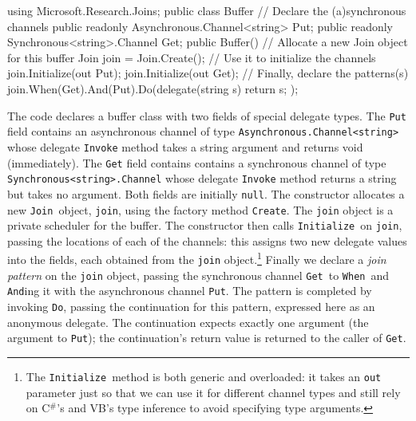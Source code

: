 \documentclass{article}
\newcommand{\csharp}{\texorpdfstring{\mbox{C$^\#$}}{C\#}}
\newcommand{\vb}{\mbox{VB}}
\newcommand{\cjoin}{{\texttt{Join}}}
\newcommand{\minitialize}{{\texttt{Initialize}}}
\newcommand{\mcreate}{{\texttt{Create}}}
\newcommand{\mwhen}{{\texttt{When}}}
\newcommand{\mand}{{\texttt{And}}}
\newcommand{\mdo}{{\texttt{Do}}}
\begin{document}
\begin{lstcsharp}
using Microsoft.Research.Joins;
public class Buffer {
  // Declare the (a)synchronous channels
  public readonly Asynchronous.Channel<string> Put;
  public readonly Synchronous<string>.Channel Get;
  public Buffer() {
    // Allocate a new Join object for this buffer
    Join join = Join.Create();
    // Use it to initialize the channels
    join.Initialize(out Put);  
    join.Initialize(out Get);
    // Finally, declare the patterns(s)
    join.When(Get).And(Put).Do(delegate(string s) {
       return s; 
    });
  }
}
\end{lstcsharp}

The code declares a buffer class with two fields of special delegate
types. The \verb+Put+ field contains an asynchronous channel of type \verb+Asynchronous.Channel<string>+ whose
delegate \verb+Invoke+ method takes a string argument and returns void (immediately).
The \verb+Get+ field contains contains a synchronous channel of type \verb+Synchronous<string>.Channel+ whose
delegate \verb+Invoke+ method returns a string but takes no argument.  Both
fields are initially \verb+null+.  The constructor allocates a new \cjoin\
object, \verb+join+, using the factory method \mcreate. The \verb+join+ object is a private scheduler
for the buffer.  The constructor then calls \minitialize\ on \verb+join+, passing the
locations of each of the channels: this assigns two new delegate
values into the fields, each obtained from the \verb+join+ object.\footnote{
The \minitialize\ method is both generic and overloaded: it takes an
{\tt out} parameter just so that we can use it for different channel
types and still rely on \csharp's and \vb's type inference to avoid
specifying type arguments.}  Finally we declare 
a \emph{join pattern} on the \verb+join+ object, passing the synchronous
channel \verb+Get+\ to \mwhen\, and {\mand}ing it with the
asynchronous channel \verb+Put+.  The pattern is completed by
invoking \mdo, passing the continuation for this pattern, expressed
here as an anonymous delegate. The continuation expects exactly one
argument (the argument to \verb+Put+); the continuation's return value
is returned to the caller of \verb+Get+. 
\end{document}
